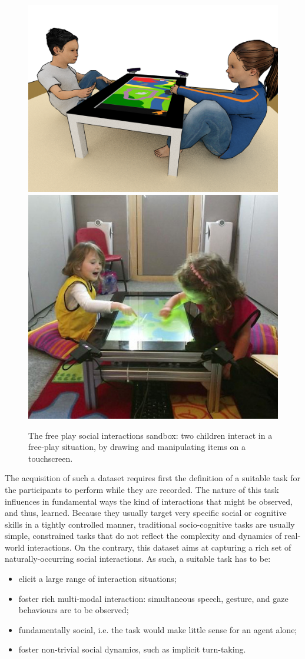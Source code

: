 \documentclass{article}
\newcommand{\ie}{i.e.\xspace}
\begin{document}
\begin{figure}
    \centering
    \includegraphics[width=0.55\linewidth]{setup-child-child.png}
    \hspace{1em}
    \includegraphics[width=0.4\linewidth]{child-child-env}
    \caption{The free play social interactions sandbox: two children interact in
    a free-play situation, by drawing and manipulating items on a touchscreen.}
    \label{fig|freeplay}
\end{figure}

The acquisition of such a dataset requires first the definition of a suitable
task for the participants to perform while they are recorded. The nature of
this task influences in fundamental ways the kind of interactions that might be
observed, and thus, learned. Because they usually target very specific social
or cognitive skills in a tightly controlled manner, traditional socio-cognitive tasks are
usually simple, constrained tasks that do not reflect the complexity and dynamics of
real-world interactions. On the contrary, this dataset aims at capturing a rich set
of naturally-occurring social interactions. As such, a suitable task has to be:

\begin{itemize}
    \item elicit a large range of interaction situations;
    \item foster rich multi-modal interaction: simultaneous speech, gesture, and gaze
        behaviours are to be observed;
    \item fundamentally social, \ie the task would make little sense for an
        agent alone;
    \item foster non-trivial social dynamics, such as implicit turn-taking.
\end{itemize}
\end{document}
